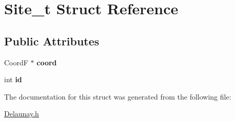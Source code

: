 \hypertarget{structSite__t}{
\section{Site\_\-t Struct Reference}
\label{structSite__t}
}
\subsection*{Public Attributes}
\begin{DoxyCompactItemize}
\item 
\hypertarget{structSite__t_a17ba1a4bd7c4da386dfcc3e1aec28d79}{
CoordF $\ast$ {\bfseries coord}}
\label{structSite__t_a17ba1a4bd7c4da386dfcc3e1aec28d79}

\item 
\hypertarget{structSite__t_ade1b8ffe335a03c4348e1f624bb8ed2e}{
int {\bfseries id}}
\label{structSite__t_ade1b8ffe335a03c4348e1f624bb8ed2e}

\end{DoxyCompactItemize}


The documentation for this struct was generated from the following file:\begin{DoxyCompactItemize}
\item 
\hyperlink{Delaunay_8h}{Delaunay.h}\end{DoxyCompactItemize}

